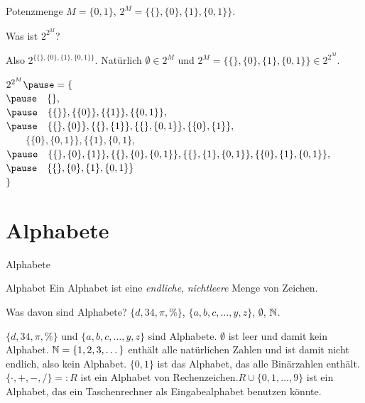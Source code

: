 \begin{frame}{Potenzmenge}
	$M = \{0, 1\}$\pause , $2^M = \{\{\}, \{0\}, \{1\}, \{0, 1\}\}$.\pause
	
	Was ist $2^{2^M}$?
	
	\begin{itemize}
		\pitem Also $2^{\{\{\}, \{0\}, \{1\}, \{0, 1\}\}}$.
		\pitem Natürlich $\emptyset \in 2^M$ und $2^M = \{\{\}, \{0\}, \{1\}, \{0, 1\}\} \in 2^{2^M}$.
	\end{itemize}
	
	\pause
	
	$2^{2^M} \pause
	= 
	\{  $\\$\pause\quad
	\{\},$\\$\pause\quad
	\{\{\}\}, 
	\{\{0\}\}, 
	\{\{1\}\},
	\{\{0, 1\}\}, $\\$\pause\quad
	\{\{\}, \{0\}\}, 
	\{\{\}, \{1\}\}, 
	\{\{\}, \{0, 1\}\}, 
	\{\{0\}, \{1\}\}, $\\$\qquad
	\{\{0\}, \{0, 1\}\}, 
	\{\{1\}, \{0, 1\}, $\\$\pause\quad
	\{\{\}, \{0\}, \{1\}\}, 
	\{\{\}, \{0\}, \{0, 1\}\}, 
	\{\{\}, \{1\}, \{0, 1\}\}, 
	\{\{0\}, \{1\}, \{0, 1\}\}, $\\$\pause\quad
	\{\{\}, \{0\}, \{1\}, \{0, 1\}\} $\\$
	\}
	$
\end{frame}

\section{Alphabete}
\begin{frame}{Alphabete}
	
	\pause
	
	\begin{block}{Alphabet}
		Ein Alphabet ist eine \emph{endliche}, \emph{nichtleere} Menge von Zeichen.
	\end{block}
	
	\pause
	
	Was davon sind Alphabete? \pause $\{d, 34, \pi, \%\}$\pause , $\{a, b, c, \dots, y, z\}$\pause , $\emptyset$\pause , $\mathbb{N}$.
	
	\begin{itemize}
		\pitem $\{d, 34, \pi, \%\}$ und $\{a, b, c, \dots, y, z\}$ sind Alphabete.
		\pitem $\emptyset$ ist leer und damit kein Alphabet.
		\pitem $\mathbb{N} = \{1, 2, 3, \dots\}$ enthält alle natürlichen Zahlen und ist damit nicht endlich, also kein Alphabet.
		\pitem $\{0, 1\}$ ist das Alphabet, das alle Binärzahlen enthält.
		\pitem $\{\cdot, +, -, /\} =: R$ ist ein Alphabet von Rechenzeichen.\pause $R \cup \{0, 1, \dots, 9\}$ ist ein Alphabet, das ein Taschenrechner als Eingabealphabet benutzen könnte.
	\end{itemize}
\end{frame}

